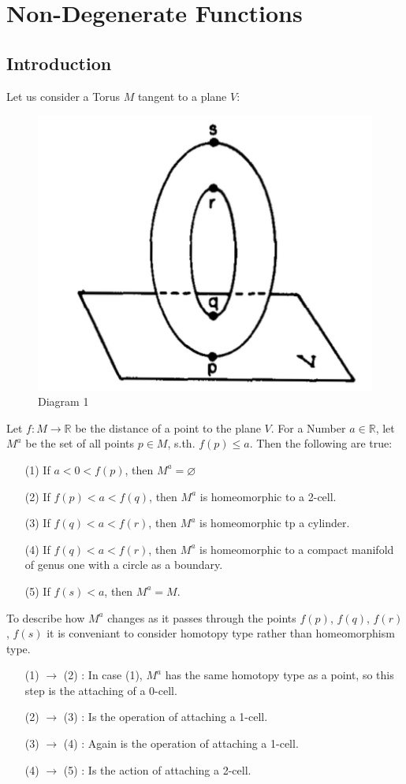 \documentclass{article}
\begin{document}
\section{Non-Degenerate Functions}

\subsection{Introduction}

Let us consider a Torus $M$ tangent to a plane $V$:
\begin{figure}[h!]
    \centering
    \includegraphics[width=0.4\linewidth]{resources/Diagram1.png}
    \caption{Diagram 1}
    \label{fig:diagram1}
\end{figure}
Let $f: M \rightarrow \mathbb{R}$ be the distance of a point to the plane $V$. 
For a Number $a \in \mathbb{R} $, let $M^a$ be the set of all points $p \in M$, s.th. $f(p) \leq a$.
Then the following are true:
\begin{enumerate}
   \item[(1)] If $a < 0 < f(p)$, then $M^a = \varnothing$
   \item[(2)] If $f(p) < a < f(q)$, then $M^a$ is homeomorphic to a 2-cell.
   \item[(3)] If $f(q) < a < f(r)$, then $M^a$ is homeomorphic tp a cylinder.
   \item[(4)] If $f(q) < a < f(r)$, then $M^a$ is homeomorphic to a compact manifold of genus one with a circle as a boundary.
   \item[(5)] If $f(s) < a$, then $M^a = M$.
\end{enumerate}

To describe how $M^a$ changes as it passes through the points $f(p)$, $f(q)$, $f(r)$, $f(s)$ it is conveniant to consider
homotopy type rather than homeomorphism type. 
\begin{enumerate}[leftmargin=2cm]
   \item[(1) $\rightarrow$ (2)]: In case (1), $M^a$ has the same homotopy type as a point, so this step is the attaching of a 0-cell. 
   \item[(2) $\rightarrow$ (3)]: Is the operation of attaching a 1-cell. 
   \item[(3) $\rightarrow$ (4)]: Again is the operation of attaching a 1-cell. 
   \item[(4) $\rightarrow$ (5)]: Is the action of attaching a 2-cell. 
\end{enumerate}
\end{document}
